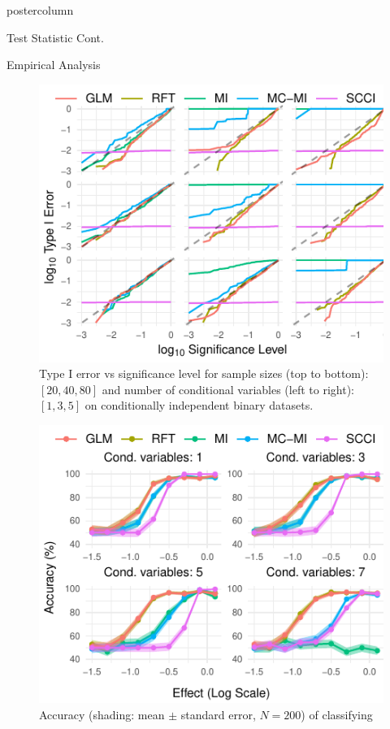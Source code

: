 \documentclass{beamer}
\begin{document}
\begin{frame}
\begin{columns}
\begin{column}{.33\textwidth}
\begin{beamercolorbox}[center]{postercolumn}
\begin{minipage}{.98\textwidth}
{\begin{myblock}{Test Statistic Cont.}
	\end{myblock}\vfill
	\begin{myblock}{Empirical Analysis}
		\begin{figure}
			\centering
			\includegraphics[scale=3]{../in_person/imgs/calibration_add_vars.pdf}
			\caption{Type I error vs significance level for sample sizes (top to
			bottom): $ [20, 40, 80] $ and number of conditional variables (left to
			right): $ [1, 3, 5] $ on conditionally independent binary datasets.}
			\label{fig:calibration}
		\end{figure}
		\begin{figure}
			\centering
			\includegraphics[scale=3]{../in_person/imgs/accuracy.pdf}
			\caption{Accuracy (shading: mean $\pm$ standard error, $N=200$) of classifying
}
\end{figure}
\end{myblock}}
\end{minipage}
\end{beamercolorbox}
\end{column}
\end{columns}
\end{frame}
\end{document}
